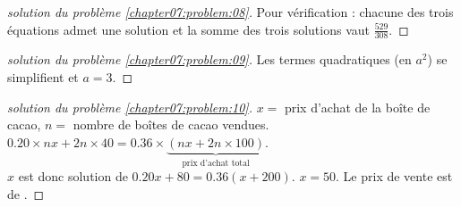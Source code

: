 \documentclass[main.tex]{subfiles}
\begin{document}
\begin{proof}[solution du problème \ref{chapter07:problem:08}]  

Pour vérification : chacune des trois équations admet une solution et la somme des trois solutions vaut $\frac{529}{308}$.

\end{proof} 
\begin{proof}[solution du problème \ref{chapter07:problem:09}]  

Les termes quadratiques (en $a^2$) se simplifient et $a=3$.

\end{proof} 
\begin{proof}[solution du problème \ref{chapter07:problem:10}]  

$x=$ prix d'achat de la boîte de cacao, $n=$ nombre de boîtes de cacao vendues.  $0.20\times nx+2n\times 40 =0.36\times \underbrace{(nx+2n\times 100)}_{\text{prix d'achat total} }$.\\
$x$ est donc solution de $0.20x+80=0.36(x+200)$. $x=50$. 
Le prix de vente est de  .

\end{proof} 
 
%	 


	
%	 

\cleardoublepage 

%	 
\end{document}
